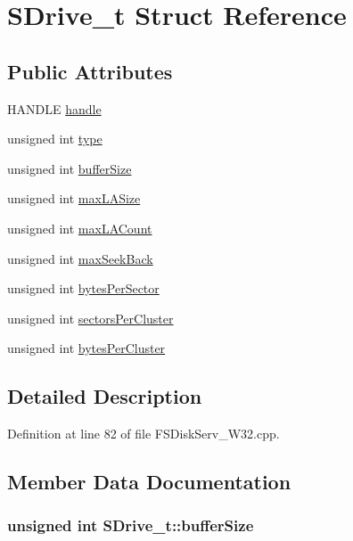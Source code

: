 \hypertarget{struct_s_drive__t}{
\section{SDrive\_\-t Struct Reference}
\label{struct_s_drive__t}
}
\subsection*{Public Attributes}
\begin{CompactItemize}
\item 
HANDLE \hyperlink{struct_s_drive__t_87d7bbf6cb8757f07cdeba13f05cf087}{handle}
\item 
unsigned int \hyperlink{struct_s_drive__t_c7f17137b18a64a3729c24790f263eb9}{type}
\item 
unsigned int \hyperlink{struct_s_drive__t_6ce4b195fff6401ff3c0e0a14135ded0}{bufferSize}
\item 
unsigned int \hyperlink{struct_s_drive__t_82bfb5892551f2b4ae7d1bfea9fd16bb}{maxLASize}
\item 
unsigned int \hyperlink{struct_s_drive__t_9751e7f3772821f7eb220fd9f36475e5}{maxLACount}
\item 
unsigned int \hyperlink{struct_s_drive__t_53e9e2a8c991d51eb458b07fb96b4620}{maxSeekBack}
\item 
unsigned int \hyperlink{struct_s_drive__t_c54a18e038048b9de16430fdcaa62019}{bytesPerSector}
\item 
unsigned int \hyperlink{struct_s_drive__t_840f05d50889266ea6de3979fa0425be}{sectorsPerCluster}
\item 
unsigned int \hyperlink{struct_s_drive__t_a294ea64310e043f9891336769bdbfa6}{bytesPerCluster}
\end{CompactItemize}


\subsection{Detailed Description}


Definition at line 82 of file FSDiskServ\_\-W32.cpp.

\subsection{Member Data Documentation}
\hypertarget{struct_s_drive__t_6ce4b195fff6401ff3c0e0a14135ded0}{
\subsubsection[{bufferSize}]{\setlength{\rightskip}{0pt plus 5cm}unsigned int {\bf SDrive\_\-t::bufferSize}}}
\label{struct_s_drive__t_6ce4b195fff6401ff3c0e0a14135ded0}




